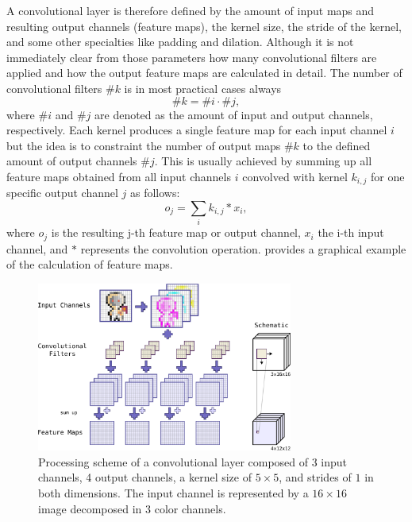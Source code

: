 A convolutional layer is therefore defined by the amount of input maps and resulting output channels (feature maps), the kernel size, the stride of the kernel, and some other specialties like padding and dilation.
Although it is not immediately clear from those parameters how many convolutional filters are applied and how the output feature maps are calculated in detail.
The number of convolutional filters $\#k$ is in most practical cases always
\begin{equation}\label{eq:nn_theory_n_filters}
  \#k = \#i \cdot \#j,
\end{equation}
where $\#i$ and $\#j$ are denoted as the amount of input and output channels, respectively.
Each kernel produces a single feature map for each input channel $i$ but the idea is to constraint the number of output maps $\#k$ to the defined amount of output channels $\#j$.
This is usually achieved by summing up all feature maps obtained from all input channels $i$ convolved with kernel $k_{i, j}$ for one specific output channel $j$ as follows:
\begin{equation}
  o_j = \sum_{i} k_{i, j} \ast x_i,
\end{equation}
where $o_j$ is the resulting j-th feature map or output channel, $x_i$ the i-th input channel, and $\ast$ represents the convolution operation.
 provides a graphical example of the calculation of feature maps.
\begin{figure}[!ht]
  \centering
    \includegraphics[width=0.75\textwidth]{./4_nn/figs/nn_theory_cnn_basics.pdf}
  \caption{Processing scheme of a convolutional layer composed of 3 input channels, 4 output channels, a kernel size of $5 \times 5$, and strides of $1$ in both dimensions. The input channel is represented by a $16 \times 16$ image decomposed in 3 color channels.}
  \label{fig:nn_theory_cnn_basics}
\end{figure}
\FloatBarrier
\noindent

